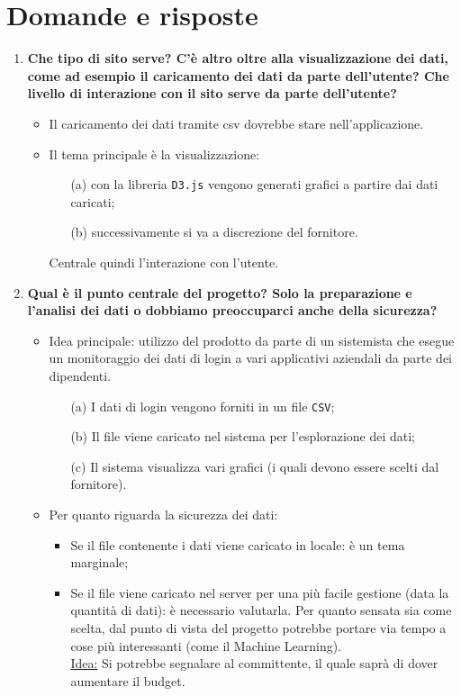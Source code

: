 \documentclass[11pt]{article}
\begin{document}
	\section{Domande e risposte}
		\begin{enumerate}
			\item \textbf{Che tipo di sito serve?
			C'è altro oltre alla visualizzazione dei dati, come ad esempio il caricamento dei dati da parte dell'utente?
			Che livello di interazione con il sito serve da parte dell'utente?}
			\medskip
			\begin{itemize}
				\item Il caricamento dei dati tramite csv dovrebbe stare nell'applicazione.
				\item Il tema principale è la visualizzazione:
				\begin{itemize}
					\item [(a)] con la libreria \texttt{D3.js} vengono generati grafici a partire dai dati caricati;
					\item [(b)] successivamente si va a discrezione del fornitore.
				\end{itemize}
				Centrale quindi l'interazione con l'utente.
			\end{itemize}
		
			\bigskip
			
			\item \textbf{Qual è il punto centrale del progetto?
			Solo la preparazione e l'analisi dei dati o dobbiamo preoccuparci anche della sicurezza?}
			\medskip
			\begin{itemize}
				\item Idea principale: utilizzo del prodotto da parte di un sistemista che esegue un monitoraggio
				dei dati di login a vari applicativi aziendali da parte dei dipendenti.
				\begin{itemize}
					\item [(a)] I dati di login vengono forniti in un file \texttt{CSV};
					\item [(b)] Il file viene caricato nel sistema per l'esplorazione dei dati;
					\item [(c)] Il sistema visualizza vari grafici (i quali devono essere scelti dal fornitore).
				\end{itemize}
				\item Per quanto riguarda la sicurezza dei dati:
				\begin{itemize}
					\item Se il file contenente i dati viene caricato in locale: è un tema marginale;
					\item Se il file viene caricato nel server per una più facile gestione (data la quantità di dati):
					è necessario valutarla.
					Per quanto sensata sia come scelta, dal punto di vista del progetto potrebbe portare via tempo a
					cose più interessanti (come il Machine Learning).\\
					\underline{Idea:} Si potrebbe segnalare al  committente, il quale saprà di dover aumentare il budget.
				\end{itemize}
			\end{itemize}


\end{enumerate}
\end{document}
